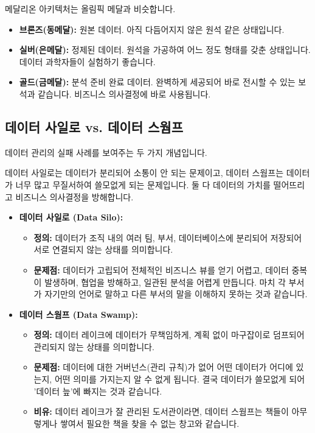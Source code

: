 \documentclass[11pt,a4paper]{article}
\begin{document}
\begin{tcolorbox}[myexample={올림픽 메달 비유}]
메달리온 아키텍처는 올림픽 메달과 비슷합니다.
\begin{itemize}
    \item \textbf{브론즈(동메달):} 원본 데이터. 아직 다듬어지지 않은 원석 같은 상태입니다.
    \item \textbf{실버(은메달):} 정제된 데이터. 원석을 가공하여 어느 정도 형태를 갖춘 상태입니다. 데이터 과학자들이 실험하기 좋습니다.
    \item \textbf{골드(금메달):} 분석 준비 완료 데이터. 완벽하게 세공되어 바로 전시할 수 있는 보석과 같습니다. 비즈니스 의사결정에 바로 사용됩니다.
\end{itemize}
\end{tcolorbox}

\subsection{데이터 사일로 vs. 데이터 스웜프}
데이터 관리의 실패 사례를 보여주는 두 가지 개념입니다.

\begin{tcolorbox}[mybox={핵심 요약: 데이터 관리의 함정}]
데이터 사일로는 데이터가 분리되어 소통이 안 되는 문제이고, 데이터 스웜프는 데이터가 너무 많고 무질서하여 쓸모없게 되는 문제입니다. 둘 다 데이터의 가치를 떨어뜨리고 비즈니스 의사결정을 방해합니다.
\end{tcolorbox}

\begin{itemize}
    \item \textbf{데이터 사일로 (Data Silo):}
    \begin{itemize}
        \item \textbf{정의:} 데이터가 조직 내의 여러 팀, 부서, 데이터베이스에 분리되어 저장되어 서로 연결되지 않는 상태를 의미합니다.
        \item \textbf{문제점:} 데이터가 고립되어 전체적인 비즈니스 뷰를 얻기 어렵고, 데이터 중복이 발생하며, 협업을 방해하고, 일관된 분석을 어렵게 만듭니다. 마치 각 부서가 자기만의 언어로 말하고 다른 부서의 말을 이해하지 못하는 것과 같습니다.
    \end{itemize}
    \item \textbf{데이터 스웜프 (Data Swamp):}
    \begin{itemize}
        \item \textbf{정의:} 데이터 레이크에 데이터가 무책임하게, 계획 없이 마구잡이로 덤프되어 관리되지 않는 상태를 의미합니다.
        \item \textbf{문제점:} 데이터에 대한 거버넌스(관리 규칙)가 없어 어떤 데이터가 어디에 있는지, 어떤 의미를 가지는지 알 수 없게 됩니다. 결국 데이터가 쓸모없게 되어 '데이터 늪'에 빠지는 것과 같습니다.
    \item \textbf{비유:} 데이터 레이크가 잘 관리된 도서관이라면, 데이터 스웜프는 책들이 아무렇게나 쌓여서 필요한 책을 찾을 수 없는 창고와 같습니다.
    \end{itemize}
\end{itemize}
\end{document}
